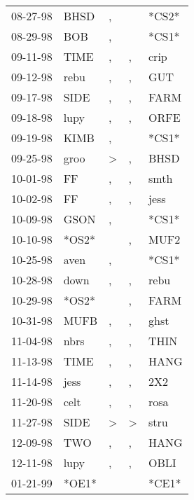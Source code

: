 \begin{supertabular}{lllll}
 08-27-98 &   BHSD &                , &                  &  *CS2* \\
 08-29-98 &    BOB &                , &                  &  *CS1* \\
 09-11-98 &   TIME &                , &                , &   crip \\
 09-12-98 &   rebu &                , &                , &    GUT \\
 09-17-98 &   SIDE &                , &                , &   FARM \\
 09-18-98 &   lupy &                , &                , &   ORFE \\
 09-19-98 &   KIMB &                , &                  &  *CS1* \\
 09-25-98 &   groo &     \textgreater &                , &   BHSD \\
 10-01-98 &     FF &                , &                , &   smth \\
 10-02-98 &     FF &                , &                , &   jess \\
 10-09-98 &   GSON &                , &                  &  *CS1* \\
 10-10-98 &  *OS2* &                  &                , &   MUF2 \\
 10-25-98 &   aven &                , &                  &  *CS1* \\
 10-28-98 &   down &                , &                , &   rebu \\
 10-29-98 &  *OS2* &                  &                , &   FARM \\
 10-31-98 &   MUFB &                , &                , &   ghst \\
 11-04-98 &   nbrs &                , &                , &   THIN \\
 11-13-98 &   TIME &                , &                , &   HANG \\
 11-14-98 &   jess &                , &                , &    2X2 \\
 11-20-98 &   celt &                , &                , &   rosa \\
 11-27-98 &   SIDE &     \textgreater &     \textgreater &   stru \\
 12-09-98 &    TWO &                , &                , &   HANG \\
 12-11-98 &   lupy &                , &                , &   OBLI \\
 01-21-99 &  *OE1* &                  &                  &  *CE1* \\

\end{supertabular}
